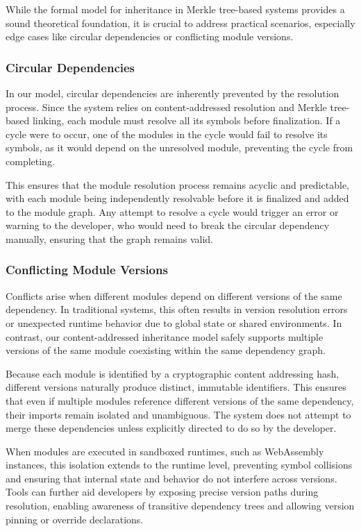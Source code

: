 \documentclass[sigplan,screen]{acmart}
\begin{document}
While the formal model for inheritance in Merkle tree-based systems provides a sound theoretical foundation, it is crucial to address practical scenarios, especially edge cases like circular dependencies or conflicting module versions. 

\subsubsection{Circular Dependencies}
\label{sec:circular-deps}

In our model, circular dependencies are inherently prevented by the resolution process. Since the system relies on content-addressed resolution and Merkle tree-based linking, each module must resolve all its symbols before finalization. If a cycle were to occur, one of the modules in the cycle would fail to resolve its symbols, as it would depend on the unresolved module, preventing the cycle from completing. 

This ensures that the module resolution process remains acyclic and predictable, with each module being independently resolvable before it is finalized and added to the module graph. Any attempt to resolve a cycle would trigger an error or warning to the developer, who would need to break the circular dependency manually, ensuring that the graph remains valid.

\subsubsection{Conflicting Module Versions}
\label{sec:conflicting-versions}

Conflicts arise when different modules depend on different versions of the same dependency. In traditional systems, this often results in version resolution errors or unexpected runtime behavior due to global state or shared environments. In contrast, our content-addressed inheritance model safely supports multiple versions of the same module coexisting within the same dependency graph.

Because each module is identified by a cryptographic content addressing hash, different versions naturally produce distinct, immutable identifiers. This ensures that even if multiple modules reference different versions of the same dependency, their imports remain isolated and unambiguous. The system does not attempt to merge these dependencies unless explicitly directed to do so by the developer.

When modules are executed in sandboxed runtimes, such as WebAssembly instances, this isolation extends to the runtime level, preventing symbol collisions and ensuring that internal state and behavior do not interfere across versions. Tools can further aid developers by exposing precise version paths during resolution, enabling awareness of transitive dependency trees and allowing version pinning or override declarations.
\end{document}
